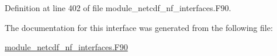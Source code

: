 Definition at line 402 of file module\+\_\+netcdf\+\_\+nf\+\_\+interfaces.\+F90.



The documentation for this interface was generated from the following file\+:\begin{DoxyCompactItemize}
\item 
\hyperlink{module__netcdf__nf__interfaces_8F90}{module\+\_\+netcdf\+\_\+nf\+\_\+interfaces.\+F90}\end{DoxyCompactItemize}
